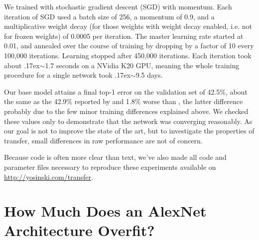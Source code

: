 We trained with stochastic gradient descent (SGD) with momentum. Each iteration of SGD used a batch size of 256, a momentum of 0.9, and a multiplicative weight decay (for those weights with weight decay enabled, i.e. not for frozen weights) of 0.0005 per iteration.
The master learning rate started at 0.01, and annealed over the course of training by dropping by a factor of 10 every 100,000 iterations. Learning stopped after 450,000 iterations.
Each iteration took about {\raise.17ex\hbox{$\scriptstyle\sim$}}1.7 seconds on a NVidia K20 GPU, meaning the whole training procedure for a single network took {\raise.17ex\hbox{$\scriptstyle\sim$}}9.5 days.


%

Our base model attains a final top-1 error on the validation set of 42.5\%, about the same as the 42.9\% reported by \cite{donahue+jia-2013-arxiv} and 1.8\% worse than \cite{Krizhevsky-2012}, the latter difference probably due to the few minor training differences explained above. We checked these values only to demonstrate that the network was converging reasonably. As our goal is not to improve the state of the art, but to investigate the properties of transfer, small differences in raw performance are not of concern.

Because code is often more clear than text, we've also made all code and parameter files necessary to reproduce these experiments available on
\url{http://yosinski.com/transfer}.



\section{How Much Does an AlexNet Architecture Overfit?}


